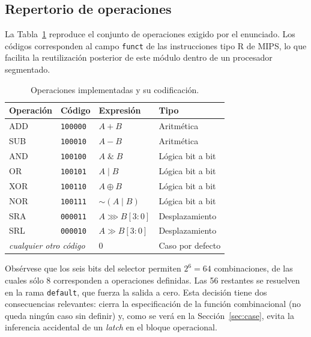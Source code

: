 \documentclass[12pt,a4paper]{article}
\begin{document}
\subsection{Repertorio de operaciones}

La Tabla~\ref{tab:ops} reproduce el conjunto de operaciones exigido por el
enunciado. Los códigos corresponden al campo \texttt{funct} de las
instrucciones tipo R de MIPS, lo que facilita la reutilización posterior de este
módulo dentro de un procesador segmentado.

\begin{table}[H]
  \centering
  \begin{tabular}{llll}
    \toprule
    \textbf{Operación} & \textbf{Código} & \textbf{Expresión} & \textbf{Tipo} \\
    \midrule
    ADD & \texttt{100000} & $A + B$                     & Aritmética \\
    SUB & \texttt{100010} & $A - B$                     & Aritmética \\
    AND & \texttt{100100} & $A \;\&\; B$                & Lógica bit a bit \\
    OR  & \texttt{100101} & $A \;|\; B$                 & Lógica bit a bit \\
    XOR & \texttt{100110} & $A \oplus B$                & Lógica bit a bit \\
    NOR & \texttt{100111} & $\sim(A \;|\; B)$           & Lógica bit a bit \\
    SRA & \texttt{000011} & $A \ggg B[3{:}0]$           & Desplazamiento \\
    SRL & \texttt{000010} & $A \gg B[3{:}0]$            & Desplazamiento \\
    \midrule
    \multicolumn{2}{l}{\textit{cualquier otro código}} & $0$ & Caso por defecto \\
    \bottomrule
  \end{tabular}
  \caption{Operaciones implementadas y su codificación.}
  \label{tab:ops}
\end{table}

Obsérvese que los seis bits del selector permiten $2^6 = 64$ combinaciones, de
las cuales sólo 8 corresponden a operaciones definidas. Las 56 restantes se
resuelven en la rama \texttt{default}, que fuerza la salida a cero. Esta
decisión tiene dos consecuencias relevantes: cierra la especificación de la
función combinacional (no queda ningún caso sin definir) y, como se verá en la
Sección~\ref{sec:case}, evita la inferencia accidental de un \emph{latch} en el
bloque operacional.
\end{document}
